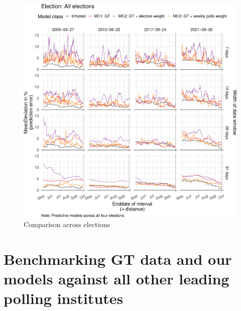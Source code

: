 \documentclass[
  letterpaper,
  DIV=11,
  numbers=noendperiod]{scrartcl}
\begin{document}
\begin{figure}[H]

\caption{\label{fig-A9}Comparison across elections}

{\centering \includegraphics{figures/fig-A9-1.pdf}

}

\end{figure}

\hypertarget{benchmarking-gt-data-and-our-models-against-all-other-leading-polling-institutes}{%
\section{Benchmarking GT data and our models against all other leading
polling
institutes}\label{benchmarking-gt-data-and-our-models-against-all-other-leading-polling-institutes}}
\end{document}
